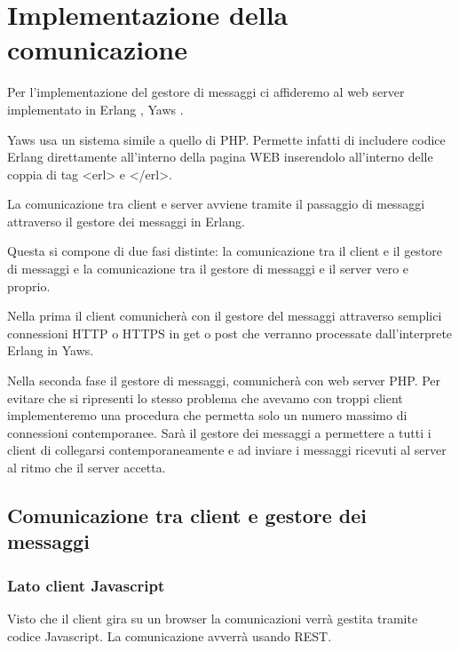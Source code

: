 \chapter{Implementazione della comunicazione}
Per l'implementazione del gestore di messaggi ci affideremo al web server implementato in Erlang \cite{web:erlang},  Yaws \cite{web:yaws}. 

Yaws usa un sistema simile a quello di PHP.
Permette infatti di includere codice Erlang direttamente all'interno della pagina WEB inserendolo all'interno delle coppia di tag <erl> e </erl>.

La comunicazione tra client e server avviene tramite il passaggio di messaggi attraverso il gestore dei messaggi in Erlang.

Questa si compone di due fasi distinte: la comunicazione tra il client e il gestore di messaggi e la comunicazione tra il gestore di messaggi e il server vero e proprio.

Nella prima il client comunicher\`a con il gestore del messaggi attraverso semplici connessioni HTTP o HTTPS in get o post che verranno processate dall'interprete Erlang in Yaws.

Nella seconda fase il gestore di messaggi, comunicher\`a con web server PHP. Per evitare che si ripresenti lo stesso problema che avevamo con troppi client implementeremo una procedura che permetta solo un numero massimo di connessioni contemporanee. Sar\`a il gestore dei messaggi a permettere a tutti i client di collegarsi contemporaneamente e ad inviare i messaggi ricevuti al server al ritmo che il server accetta.

\section{Comunicazione tra client e gestore dei messaggi}
\subsection{Lato client Javascript}
Visto che il client gira su un browser la comunicazioni verr\`a gestita tramite codice Javascript. La comunicazione avverr\`a usando REST.

